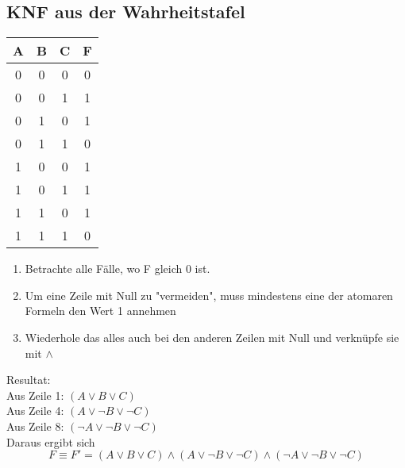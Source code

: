 \documentclass{article}
\begin{document}
\begin{itemize}
		\subsection{KNF aus der Wahrheitstafel}
		\begin{tabular}{c|c|c||c}
			A & B & C & F \\
			\hline
			0 & 0 & 0 & 0 \\
			0 & 0 & 1 & 1 \\
			0 & 1 & 0 & 1 \\
			0 & 1 & 1 & 0 \\
			1 & 0 & 0 & 1 \\
			1 & 0 & 1 & 1 \\
			1 & 1 & 0 & 1 \\
			1 & 1 & 1 & 0 \\
		\end{tabular}
		\begin{enumerate}
			\item Betrachte alle Fälle, wo F gleich 0 ist. 
			\item Um eine Zeile mit Null zu "vermeiden", muss mindestens eine der atomaren Formeln den Wert 1 annehmen
			\item Wiederhole das alles auch bei den anderen Zeilen mit Null und verknüpfe sie mit $\wedge$
		\end{enumerate}
			Resultat: \\
			Aus Zeile 1: $(A \vee B \vee C)$ \\
			Aus Zeile 4: $(A \vee \neg B \vee \neg C)$ \\
			Aus Zeile 8: $(\neg A \vee \neg B \vee \neg C)$ \\
		Daraus ergibt sich 
		\[F \equiv F' = (A \vee B \vee C) \wedge (A \vee \neg B \vee \neg C) \wedge (\neg A \vee \neg B \vee \neg C)\]

\end{itemize}
\end{document}
